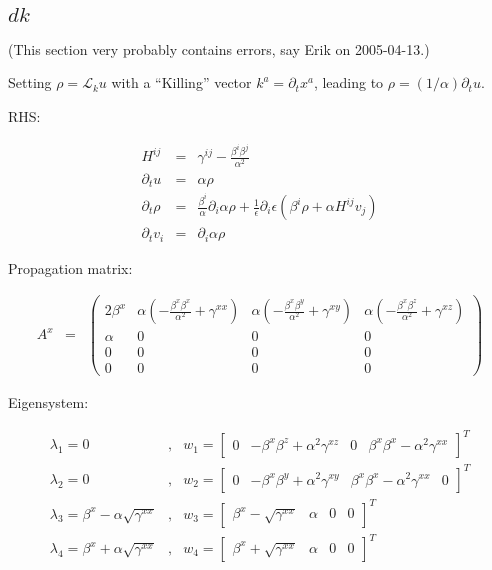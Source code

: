 \documentclass{article}
\begin{document}
\subsection{$dk$}

   (This section very probably contains errors, say Erik on
   2005-04-13.)

   Setting $\rho = \mathcal{L}_k u$ with a ``Killing'' vector $k^a =
   \partial_t x^a$, leading to $\rho = (1/\alpha) \partial_t u$.

   RHS:

\begin{eqnarray}
   H^{ij} & = & \gamma^{ij} - \frac{ \beta^i \beta^j }{ \alpha^2 }
\\
   \partial_t u & = & \alpha \rho
\\
   \partial_t \rho & = & \frac{\beta^i}{\alpha} \partial_i \alpha \rho
   + \frac{1}{\epsilon} \partial_i \epsilon \left( \beta^i \rho +
   \alpha H^{ij} v_j \right)
\\
   \partial_t v_i & = & \partial_i \alpha \rho
\end{eqnarray}

   Propagation matrix:

\begin{eqnarray}
   A^x & = & \left( \begin{array}{cccc}
%
   2 \beta^x & \alpha \left( - \frac{\beta^x \beta^x}{\alpha^2} +
   \gamma^{xx} \right) & \alpha \left( - \frac{\beta^x
   \beta^y}{\alpha^2} + \gamma^{xy} \right) & \alpha \left( -
   \frac{\beta^x \beta^z}{\alpha^2} + \gamma^{xz} \right)
\\
   \alpha & 0 & 0 & 0
\\
   0 & 0 & 0 & 0
\\
   0 & 0 & 0 & 0
%
   \end{array} \right)
\end{eqnarray}

   Eigensystem:

\begin{eqnarray}
   \lambda_1 = 0 &, & w_1 = \left[ \begin{array}{cccc}
%
   0 & - \beta^x \beta^z + \alpha^2 \gamma^{xz} & 0 & \beta^x \beta^x
   - \alpha^2 \gamma^{xx}
%
   \end{array} \right]^T
\\
   \lambda_2 = 0 &, & w_2 = \left[ \begin{array}{cccc}
%
   0 & - \beta^x \beta^y + \alpha^2 \gamma^{xy} & \beta^x \beta^x -
   \alpha^2 \gamma^{xx} & 0
%
   \end{array} \right]^T
\\
   \lambda_3 = \beta^x - \alpha \sqrt{\gamma^{xx}} &, & w_3 = \left[
   \begin{array}{cccc}
%
   \beta^x - \sqrt{\gamma^{xx}} & \alpha & 0 & 0
%
   \end{array} \right]^T
\\
   \lambda_4 = \beta^x + \alpha \sqrt{\gamma^{xx}} &, & w_4 = \left[
   \begin{array}{cccc}
%
   \beta^x + \sqrt{\gamma^{xx}} & \alpha & 0 & 0
%
   \end{array} \right]^T
\end{eqnarray}
\end{document}
